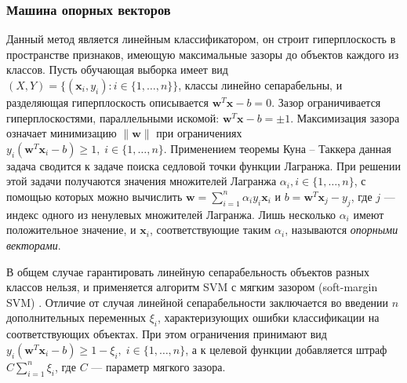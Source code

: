 \subsubsection{Машина опорных векторов}
Данный метод является линейным классификатором, он строит гиперплоскость в пространстве признаков, имеющую максимальные зазоры до объектов каждого из классов. Пусть обучающая выборка имеет вид \(\left(X, Y\right)=\{\left(\mathbf{x}_i,y_i\right):i\in\{1,\dotsc,n\}\}\), классы линейно сепарабельны, и разделяющая гиперплоскость описывается \(\mathbf{w}^T\mathbf{x}-b=0\). Зазор ограничивается гиперплоскостями, параллельными искомой: \(\mathbf{w}^T\mathbf{x}-b=\pm1\). Максимизация зазора означает минимизацию \(\|\mathbf{w}\|\) при ограничениях \(y_i\left(\mathbf{w}^T\mathbf{x}_i-b\right)\geqslant1,\;i\in\{1,\dotsc,n\}\). Применением теоремы Куна -- Таккера данная задача сводится к задаче поиска седловой точки функции Лагранжа. При решении этой задачи получаются значения множителей Лагранжа \(\alpha_i, i\in\{1,\dotsc,n\}\), с помощью которых можно вычислить \(\mathbf{w}=\sum_{i=1}^n \alpha_i y_i\mathbf{x}_i\) и \(b=\mathbf{w}^T\mathbf{x}_j-y_j\), где \(j\) --- индекс одного из ненулевых множителей Лагранжа. Лишь несколько \(\alpha_i\) имеют положительное значение, и \(\mathbf{x}_i\), соответствующие таким \(\alpha_i\), называются \emph{опорными векторами}.

В общем случае гарантировать линейную сепарабельность объектов разных классов нельзя, и применяется алгоритм SVM с мягким зазором (soft-margin SVM) \cite{cortes-vapnik}. Отличие от случая линейной сепарабельности заключается во введении \(n\) дополнительных переменных \(\xi_i\), характеризующих ошибки классификации на соответствующих объектах. При этом ограничения принимают вид \(y_i\left(\mathbf{w}^T\mathbf{x}_i - b\right)\geqslant 1-\xi_i,\;i\in\{1,\dotsc,n\}\), а к целевой функции добавляется штраф \(C\sum_{i=1}^n\xi_i\), где \(C\) --- параметр мягкого зазора.


